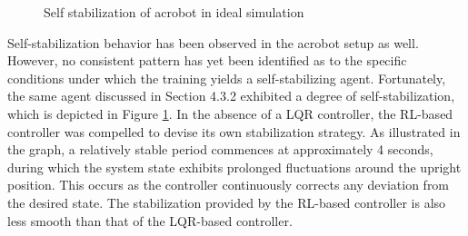 \begin{figure}[H]
    \centering
    \caption{Self stabilization of acrobot in ideal simulation}
    \label{fig:acrobot_self_stabilization}
\end{figure}

Self-stabilization behavior has been observed in the acrobot setup as well. However, no consistent pattern has yet been identified as to the specific conditions under which the training yields a self-stabilizing agent. Fortunately, the same agent discussed in Section 4.3.2 exhibited a degree of self-stabilization, which is depicted in Figure \ref{fig:acrobot_self_stabilization}. In the absence of a LQR controller, the RL-based controller was compelled to devise its own stabilization strategy. As illustrated in the graph, a relatively stable period commences at approximately 4 seconds, during which the system state exhibits prolonged fluctuations around the upright position. This occurs as the controller continuously corrects any deviation from the desired state. The stabilization provided by the RL-based controller is also less smooth than that of the LQR-based controller.

\cleardoublepage
